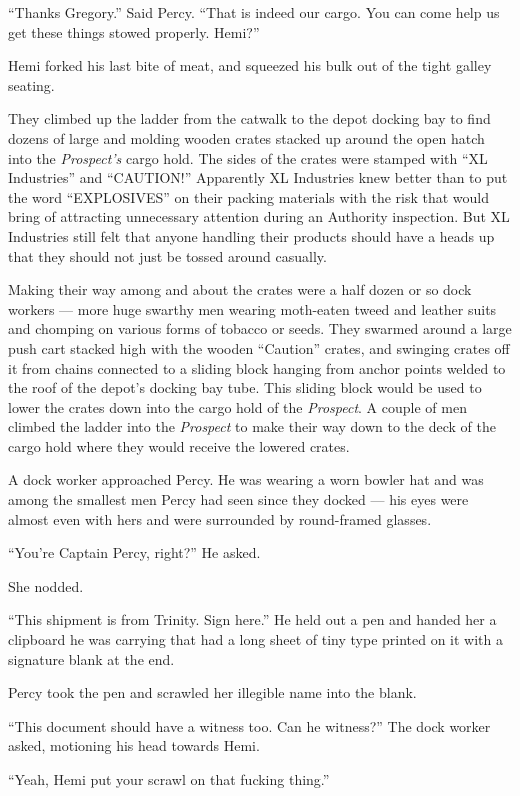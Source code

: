 \documentclass[
]{scrbook}
\begin{document}
``Thanks Gregory.'' Said Percy. ``That is indeed our cargo. You can come
help us get these things stowed properly. Hemi?''

Hemi forked his last bite of meat, and squeezed his bulk out of the
tight galley seating.

They climbed up the ladder from the catwalk to the depot docking bay to
find dozens of large and molding wooden crates stacked up around the
open hatch into the \emph{Prospect's} cargo hold. The sides of the
crates were stamped with ``XL Industries'' and ``CAUTION!'' Apparently
XL Industries knew better than to put the word ``EXPLOSIVES'' on their
packing materials with the risk that would bring of attracting
unnecessary attention during an Authority inspection. But XL Industries
still felt that anyone handling their products should have a heads up
that they should not just be tossed around casually.

Making their way among and about the crates were a half dozen or so dock
workers --- more huge swarthy men wearing moth-eaten tweed and leather
suits and chomping on various forms of tobacco or seeds. They swarmed
around a large push cart stacked high with the wooden ``Caution''
crates, and swinging crates off it from chains connected to a sliding
block hanging from anchor points welded to the roof of the depot's
docking bay tube. This sliding block would be used to lower the crates
down into the cargo hold of the \emph{Prospect}. A couple of men climbed
the ladder into the \emph{Prospect} to make their way down to the deck
of the cargo hold where they would receive the lowered crates.

A dock worker approached Percy. He was wearing a worn bowler hat and was
among the smallest men Percy had seen since they docked --- his eyes
were almost even with hers and were surrounded by round-framed glasses.

``You're Captain Percy, right?'' He asked.

She nodded.

``This shipment is from Trinity. Sign here.'' He held out a pen and
handed her a clipboard he was carrying that had a long sheet of tiny
type printed on it with a signature blank at the end.

Percy took the pen and scrawled her illegible name into the blank.

``This document should have a witness too. Can he witness?'' The dock
worker asked, motioning his head towards Hemi.

``Yeah, Hemi put your scrawl on that fucking thing.''
\end{document}
